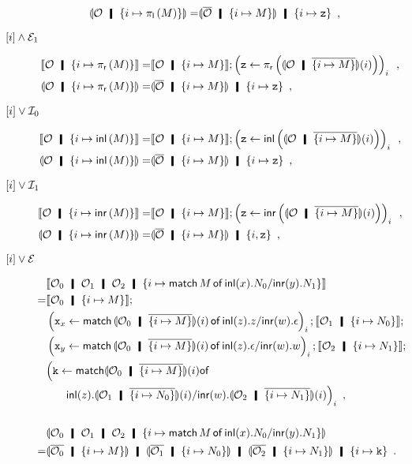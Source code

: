 \begin{description}
\begin{align*}
 \semoi{\hypert\hmid \imapsto{\lpil M}}=& \semoi{\overline \hypert\hmid
 \imapsto{M}}\hmid \{{i\mapsto \p z}\}\enspace,
\end{align*}
 \item[$\lbrack {i}\rbrack\wedge\mathcal E_1$]
\begin{align*}
 \semo{\hypert\hmid \imapsto{\lpir M}} =& \semo{\hypert\hmid \imapsto{M}};
 \left(\p z \leftarrow
 \lpir{ \semoi{\hypert\hmid\overline{\imapsto{M}}}(i) }\right)_i\enspace, \\
 \semoi{\hypert\hmid \imapsto{\lpir{M}}}=& \semoi{\overline \hypert\hmid
 \imapsto{M}}\hmid
 \{{i\mapsto \p z}\}\enspace,
\end{align*}
 \item[$\lbrack {i}\rbrack\vee\mathcal I_0$]
\begin{align*}
 \semo{\hypert\hmid \imapsto{\linl{M}}} =
 & \semo{\hypert\hmid \imapsto{M}}; \left(\p z \leftarrow
 \linl{ \semoi{\hypert\hmid\overline{\imapsto{M}}}(i)}\right)_i\enspace, \\
 \semoi{\hypert\hmid \imapsto{\linl M}}=& \semoi{\overline \hypert\hmid
 \imapsto{M}}
 \hmid
 \{{i\mapsto \p z}\}\enspace,
\end{align*}
 \item[$\lbrack {i}\rbrack\vee\mathcal I_1$]
\begin{align*}
 \semo{\hypert\hmid \imapsto{\linr M}} =& \semo{\hypert\hmid \imapsto{M}};
 \left(\p z \leftarrow
 \linr{\semoi{\hypert\hmid\overline{\imapsto{M}}}(i)}\right)_i\enspace, \\
 \semoi{\hypert\hmid \imapsto{\linr{M}}}=& \semoi{\overline \hypert\hmid
 \imapsto{M}}\hmid
 \{{i, \p z}\}\enspace,
\end{align*}
 \item[$\lbrack {i}\rbrack\vee\mathcal E$]
\begin{align*}
 &\semo{\hypert_0\hmid \hypert_1\hmid \hypert_2\hmid \{i\mapsto
 \mat M x{N_0}y{N_1}\}}
 \\
 =&\semo{\hypert_0\hmid\imapsto{M}};\\&
 \left(\p x_x\leftarrow
 \mat{\semoi{\hypert_0\hmid\overline{\imapsto{M}}}(i)}{z}{z}{w}{\epsilon}\right)_i;
 \semo{\hypert_1\hmid\imapsto{N_0}};\\&
 \left(\p x_y\leftarrow
 \mat{\semoi{\hypert_0\hmid\overline{\imapsto{M}}}(i)}{z}{\epsilon}{w}{w}\right)_i;
 \semo{\hypert_2\hmid\imapsto{N_1}};\\&
 \Big(\p k \leftarrow
 \mathsf{match}
 {\semoi{\hypert_0\hmid\overline{\imapsto{M}}}(i)}
 \mathsf{of} \\
 &\phantom{k\leftarrow}\inl{z}. {\semoi{\hypert_1\hmid\overline{\imapsto{N_0}}}(i)}/\inr{w}. {\semoi{\hypert_2\hmid\overline{\imapsto{N_1}}}(i)}\Big)_i\enspace,
 \\
 \\
 &\semoi{\hypert_0\hmid \hypert_1\hmid \hypert_2\hmid \{i\mapsto
 \mat M x{N_0}y{N_1}\}}\\
 =&
 \semoi{\overline{\hypert_0}\hmid \imapsto{M}}\hmid
 \semoi{\overline{\hypert_1}\hmid \imapsto{N_0}}\hmid
 \semoi{\overline{\hypert_2}\hmid \imapsto{N_1}}\hmid \imapsto{\p k}\enspace.
\end{align*}
\end{description}
